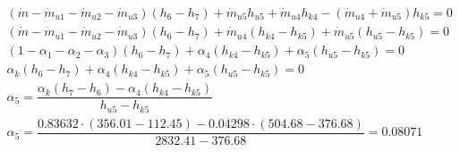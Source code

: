 \begin{math}
	\begin{array}{l}
		(\dot m - \dot m_{u1} - \dot m_{u2} - \dot m_{u3})( h_{6} - h_{7} )
			+ \dot m_{u5} h_{u5} + \dot m_{u4} h_{k4}
			- (\dot m_{u4} + \dot m_{u5}) h_{k5} = 0 \\
		(\dot m - \dot m_{u1} - \dot m_{u2} - \dot m_{u3})(h_{6} - h_{7})
			+ \dot m_{u4} ( h_{k4} - h_{k5} )
			+ \dot m_{u5} ( h_{u5} - h_{k5} ) = 0 \\
		(1 - \alpha_1 - \alpha_2 - \alpha_3)(h_{6} - h_{7})
			+ \alpha_4 ( h_{k4} - h_{k5} )
			+ \alpha_5 ( h_{u5} - h_{k5} ) = 0 \\
		\alpha_k(h_{6} - h_{7}) + \alpha_4 ( h_{k4} - h_{k5} )
			+ \alpha_5 ( h_{u5} - h_{k5} ) = 0 \\

		\alpha_5 = \dfrac{
			\alpha_k (h_7 - h_6)
			- \alpha_4 ( h_{k4} - h_{k5} )
			}{h_{u5} - h_{k5}} \\
		\alpha_5 = \dfrac{
			\num{0,83632} \cdot (\num{356,01} - \num{112,45})
			- \num{0,04298} \cdot ( \num{504,68} - \num{376,68} )
		}{ \num{2832,41} - \num{376,68} }
			= \num{0,08071} \\
	\end{array}
\end{math}

